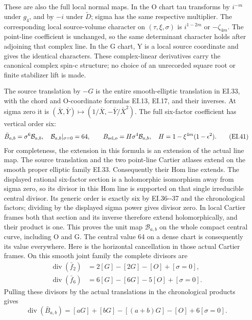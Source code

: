 These are also the full local normal maps. In the O chart tau
transforms by \(i^{-m}\) under \(g_4\), and by \(-i\) under
\(\widetilde D\); sigma has the same respective multiplier.
The corresponding local source-volume character on
\((\tau,\xi,\sigma)\) is \(i^{1-2m}\) or
\(-\zeta_{4m}\). The point-line coefficient is unchanged, so
the same determinant character holds after adjoining that complex
line. In the G chart, Y is a local source coordinate and gives
the identical characters. These complex-linear derivatives carry
the canonical complex spin-c structure; no choice of an unrecorded
square root or finite stabilizer lift is made.

The source translation by \(-G\) is the entire smooth-elliptic
translation in EI.33, with the chord and O-coordinate formulas
EI.13, EI.17, and their inverses. At sigma zero it is
\((\bar X,\bar Y)\mapsto(1/\bar X,-\bar Y/\bar X^2)\).
The full six-factor coefficient has vertical order six:
\[
 \bar B_{a,b}=\sigma^6\mathcal B_{a,b},\quad
 \mathcal B_{a,b}|_{\sigma=0}=64,
 \qquad B_{{\rm sel},o}=H\sigma^4\mathcal B_{a,b},
 \quad H=1-\xi^{4m}(1-\epsilon^2).
 \tag{EI.41}
\]
For completeness, the extension in this formula is an extension of
the actual line map. The source translation and the two point-line
Cartier atlases extend on the smooth proper elliptic family EI.33.
Consequently their Hom line extends. The displayed rational
six-factor section is a holomorphic isomorphism away from sigma
zero, so its divisor in this Hom line is supported on that single
irreducible central divisor. Its generic order is exactly six by
EI.36-\/-37 and the chronological factors; dividing by the displayed
sigma power gives divisor zero. In local Cartier frames both that
section and its inverse therefore extend holomorphically, and their
product is one. This proves the unit map \(\mathcal B_{a,b}\) on
the whole compact central curve, including O and G. The central
value 64 on a dense chart is consequently its value everywhere.
Here is the horizontal cancellation in those actual Cartier frames.
On this smooth joint family the complete divisors are
\[
 \begin{aligned}
 \operatorname{div}(\bar f_2)&=2[G]-[2G]-[O]+[\sigma=0],\\
 \operatorname{div}(\bar f_6)&=6[G]-[6G]-5[O]+[\sigma=0].
 \end{aligned}
 \tag{EI.41a}
\]
Pulling these divisors by the actual translations in the chronological
products gives
\[
 \operatorname{div}(\bar B_{a,b})
 =[aG]+[bG]-[(a+b)G]-[O]+6[\sigma=0].
 \tag{EI.41b}
\]
